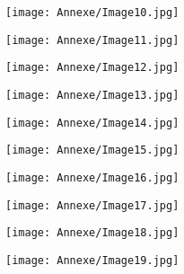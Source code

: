    \begin{figure}[H]
   \centering
   \texttt{[image: Annexe/Image10.jpg]}
	\caption{\cite{specialelsa}}\label{fig:napoleon}
    \end{figure}


    \begin{figure}[H]
   \centering
   \texttt{[image: Annexe/Image11.jpg]}
	\caption{\cite{plafondodeon}}\label{fig:odeon}
    \end{figure}


    \begin{figure}[H]
   \centering
   \texttt{[image: Annexe/Image12.jpg]}
	\caption{\cite{specialelsa}}\label{fig:elsa2}
    \end{figure}


    \begin{figure}[H]
   \centering
   \texttt{[image: Annexe/Image13.jpg]}
	\caption{\cite{specialelsa}}\label{fig:elsa3}
    \end{figure}


    \begin{figure}[H]
   \centering
   \texttt{[image: Annexe/Image14.jpg]}
	\caption{\cite{specialelsa}}\label{fig:elsa4}
    \end{figure}


    \begin{figure}[H]
   \centering
   \texttt{[image: Annexe/Image15.jpg]}
	\caption{\cite{courbetcommunard}}\label{fig:courbetcommune}
    \end{figure}


    \begin{figure}[H]
   \centering
   \texttt{[image: Annexe/Image16.jpg]}
	\caption{\cite{specialelsa}}\label{fig:elsa5}
    \end{figure}


    \begin{figure}[H]
   \centering
   \texttt{[image: Annexe/Image17.jpg]}
	\caption{\cite{durand}}\label{fig:nuitcommejour}
    \end{figure}


    \begin{figure}[H]
   \centering
   \texttt{[image: Annexe/Image18.jpg]}
	\caption{\cite{specialelsa}}\label{fig:elsa6}
    \end{figure}


    \begin{figure}[H]
   \centering
   \texttt{[image: Annexe/Image19.jpg]}
	\caption{\cite{specialelsa}}\label{fig:elsa7}
    \end{figure}


